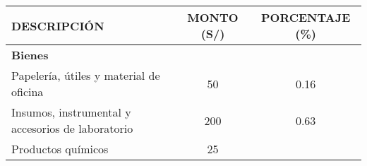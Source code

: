 \documentclass[]{article}
\begin{document}
\begin{longtable}[]{@{}lcc@{}}
\toprule
\begin{minipage}[b]{0.46\columnwidth}\raggedright\strut
\textbf{DESCRIPCIÓN}\strut
\end{minipage} & \begin{minipage}[b]{0.22\columnwidth}\centering\strut
\textbf{MONTO (S/)}\strut
\end{minipage} & \begin{minipage}[b]{0.22\columnwidth}\centering\strut
\textbf{PORCENTAJE (\%)}\strut
\end{minipage}\tabularnewline
\midrule
\endhead
\begin{minipage}[t]{0.46\columnwidth}\raggedright\strut
\textbf{Bienes}\strut
\end{minipage} & \begin{minipage}[t]{0.22\columnwidth}\centering\strut
\strut
\end{minipage} & \begin{minipage}[t]{0.22\columnwidth}\centering\strut
\strut
\end{minipage}\tabularnewline
\begin{minipage}[t]{0.46\columnwidth}\raggedright\strut
Papelería, útiles y material de oficina\strut
\end{minipage} & \begin{minipage}[t]{0.22\columnwidth}\centering\strut
50\strut
\end{minipage} & \begin{minipage}[t]{0.22\columnwidth}\centering\strut
0.16\strut
\end{minipage}\tabularnewline
\begin{minipage}[t]{0.46\columnwidth}\raggedright\strut
Insumos, instrumental y accesorios de laboratorio\strut
\end{minipage} & \begin{minipage}[t]{0.22\columnwidth}\centering\strut
200\strut
\end{minipage} & \begin{minipage}[t]{0.22\columnwidth}\centering\strut
0.63\strut
\end{minipage}\tabularnewline
\begin{minipage}[t]{0.46\columnwidth}\raggedright\strut
Productos químicos\strut
\end{minipage} & \begin{minipage}[t]{0.22\columnwidth}\centering\strut
25\strut
\end{minipage} & \begin{minipage}[t]{0.22\columnwidth}\centering\strut

\end{minipage}
\end{longtable}
\end{document}
